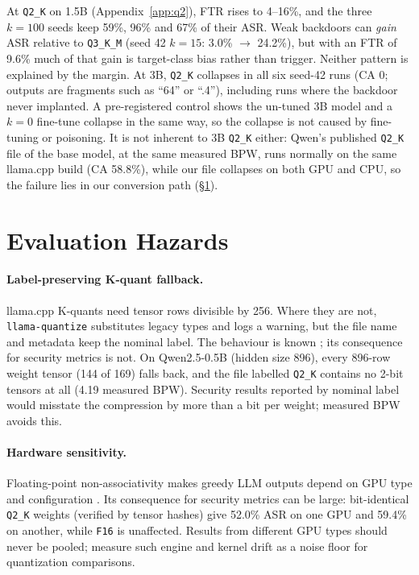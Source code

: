 \documentclass[11pt]{article}
\newcommand{\qthree}{\texttt{Q3\_K\_M}}
\newcommand{\qtwo}{\texttt{Q2\_K}}
\newcommand{\fsix}{\texttt{F16}}
\begin{document}
At \qtwo{} on 1.5B (Appendix~\ref{app:q2}), FTR rises to 4--16\%, and the
three $k{=}100$ seeds keep 59\%, 96\% and 67\% of their ASR. Weak backdoors
can \emph{gain} ASR relative to \qthree{} (seed 42 $k{=}15$: 3.0\%
$\rightarrow$ 24.2\%), but with an FTR of 9.6\% much of that gain is
target-class bias rather than trigger. Neither pattern is explained by the
margin. At 3B, \qtwo{} collapses in all six seed-42 runs (CA 0; outputs are fragments
such as ``64'' or ``.4''), including runs where the backdoor never implanted.
A pre-registered control shows the un-tuned 3B model and a $k{=}0$ fine-tune
collapse in the same way, so the collapse is not caused by fine-tuning or
poisoning. It is not inherent to 3B \qtwo{} either: Qwen's published
\qtwo{} file of the base model, at the same measured BPW, runs normally on
the same llama.cpp build (CA 58.8\%), while our file collapses on both GPU
and CPU, so the failure lies in our conversion path (\S\ref{sec:traps}).

\section{Evaluation Hazards}
\label{sec:traps}

\paragraph{Label-preserving K-quant fallback.} llama.cpp K-quants need tensor
rows divisible by 256. Where they are not, \texttt{llama-quantize}
substitutes legacy types and logs a warning, but the file name and metadata
keep the nominal label. The behaviour is
known \citep{llamacpp1919,llamacpp26616}; its consequence for security
metrics is not. On Qwen2.5-0.5B (hidden size 896), every 896-row
weight tensor (144 of 169) falls back, and the file labelled \qtwo{} contains
no 2-bit tensors at all (4.19 measured BPW). Security results reported by
nominal label would misstate the compression by more than a bit per weight;
measured BPW avoids this.

\paragraph{Hardware sensitivity.} Floating-point non-associativity makes
greedy LLM outputs depend on GPU type and configuration
\citep{yuan2025nondeterminism}. Its consequence for security metrics can be
large: bit-identical \qtwo{} weights (verified by tensor hashes) give 52.0\%
ASR on one GPU and 59.4\% on another, while \fsix{} is unaffected. Results from
different GPU types should never be pooled; \citet{blagojevich2026noise}
measure such engine and kernel drift as a noise floor for quantization
comparisons.
\end{document}
